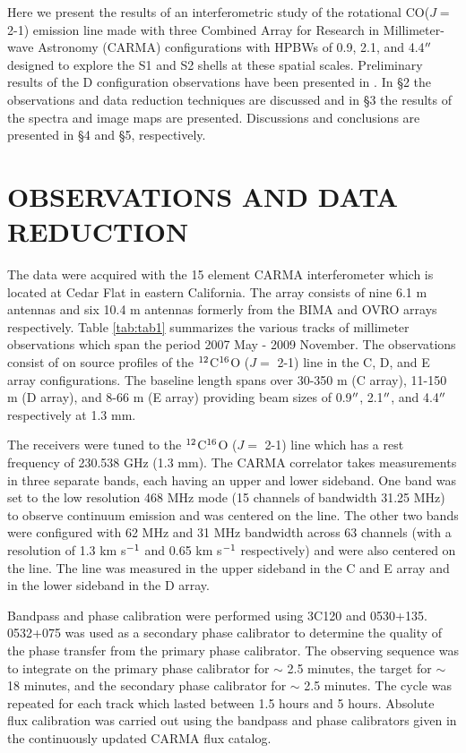 \documentclass[preprint2]{aastex}
\begin{document}
Here we present the results of an interferometric study of the rotational CO($J=$ 2-1) emission line made with three Combined Array for Research in Millimeter-wave Astronomy (CARMA) configurations with HPBWs of 0.9, 2.1, and 4.4$\mbox{$^{\prime\prime}$}$ designed to explore the S1 and S2 shells at these spatial scales.  Preliminary results of the D configuration observations have been presented in \cite{2009AIPC.1094..868H}. In \S2 the observations and data reduction techniques are discussed and in \S3 the results of the spectra and image maps are presented. Discussions and conclusions are presented in \S4 and \S5, respectively.

\section{OBSERVATIONS AND DATA REDUCTION}

The data were acquired with the 15 element CARMA interferometer \citep{2004ASPC..314..768S} which is located at Cedar Flat in eastern California. The array consists of nine 6.1 m antennas and six 10.4 m antennas formerly from the BIMA and OVRO arrays respectively. Table \ref{tab:tab1} summarizes the various tracks of millimeter observations which span the period 2007 May - 2009 November. The observations consist of on source profiles of the $\rm{{}^{12}}$C$\rm{{}^{16}}$O ($J=$ 2-1) line in the C, D, and E array configurations. The baseline length spans over 30-350 m (C array), 11-150 m (D array), and 8-66 m (E array) providing beam sizes of 0.9$\mbox{$^{\prime\prime}$}$, 2.1$\mbox{$^{\prime\prime}$}$, and 4.4$\mbox{$^{\prime\prime}$}$ respectively at 1.3 mm. 

The receivers were tuned to the $\rm{{}^{12}}$C$\rm{{}^{16}}$O ($J=$ 2-1) line which has a rest frequency of 230.538 GHz (1.3 mm). The CARMA correlator takes measurements in three separate bands, each having an upper and lower sideband. One band was set to the low resolution 468 MHz mode (15 channels of bandwidth 31.25 MHz) to observe continuum emission and was centered on the line. The other two bands were configured with 62 MHz and 31 MHz bandwidth across 63 channels (with a resolution of 1.3 km s$\rm{{}^{-1}}$ and 0.65 km s$\rm{{}^{-1}}$ respectively) and were also centered on the line. The line was measured in the upper sideband in the C and E array and in the lower sideband in the D array.

Bandpass and phase calibration were performed using 3C120 and 0530+135. 0532+075 was used as a secondary phase calibrator to determine the quality of the phase transfer from the primary phase calibrator. The observing sequence was to integrate on the primary phase calibrator for $\sim$ 2.5 minutes, the target for $\sim$ 18 minutes, and the secondary phase calibrator for $\sim$ 2.5 minutes. The cycle was repeated for each track which lasted between 1.5 hours and 5 hours. Absolute flux calibration was carried out using the bandpass and phase calibrators given in the continuously updated CARMA flux catalog.
\end{document}
